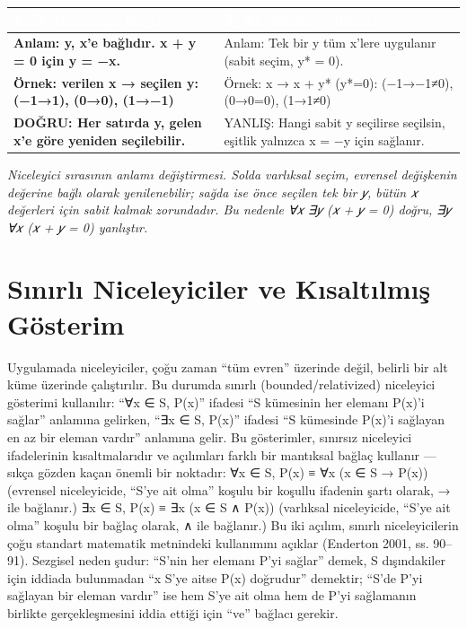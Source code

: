 \par\smallskip\begin{center}{\renewcommand{\arraystretch}{1.25}\footnotesize\begin{tabularx}{\linewidth}{|Y|Y|}\hline
{}\textcolor{white}{\bfseries ∀x ∃y  (her x için bir y)} & \textcolor{white}{\bfseries ∃y ∀x  (tek bir y, tüm x)} \\ \hline
\textbf{Anlam: y, x’e bağlıdır. x + y = 0 için y = −x.} & Anlam: Tek bir y tüm x’lere uygulanır (sabit seçim, y* = 0). \\ \hline
\textbf{Örnek: verilen x → seçilen y: (−1→1), (0→0), (1→−1)} & Örnek: x → x + y* (y*=0): (−1→−1≠0), (0→0=0), (1→1≠0) \\ \hline
\textbf{DOĞRU: Her satırda y, gelen x’e göre yeniden seçilebilir.} & YANLIŞ: Hangi sabit y seçilirse seçilsin, eşitlik yalnızca x = −y için sağlanır. \\ \hline
\end{tabularx}}\end{center}\par\smallskip

{\small\itshape\sffamily\color{gray}Niceleyici sırasının anlamı değiştirmesi. Solda varlıksal seçim, evrensel değişkenin değerine bağlı olarak yenilenebilir; sağda ise önce seçilen tek bir 𝑦, bütün 𝑥 değerleri için sabit kalmak zorundadır. Bu nedenle ∀𝑥 ∃𝑦 (𝑥 + 𝑦 = 0) doğru, ∃𝑦 ∀𝑥 (𝑥 + 𝑦 = 0) yanlıştır.}

\section{Sınırlı Niceleyiciler ve Kısaltılmış Gösterim}

Uygulamada niceleyiciler, çoğu zaman “tüm evren” üzerinde değil, belirli bir alt küme üzerinde çalıştırılır. Bu durumda sınırlı (bounded/relativized) niceleyici gösterimi kullanılır: “∀x ∈ S, P(x)” ifadesi “S kümesinin her elemanı P(x)’i sağlar” anlamına gelirken, “∃x ∈ S, P(x)” ifadesi “S kümesinde P(x)’i sağlayan en az bir eleman vardır” anlamına gelir. Bu gösterimler, sınırsız niceleyici ifadelerinin kısaltmalarıdır ve açılımları farklı bir mantıksal bağlaç kullanır — sıkça gözden kaçan önemli bir noktadır: ∀x ∈ S, P(x) ≡ ∀x (x ∈ S → P(x)) (evrensel niceleyicide, “S’ye ait olma” koşulu bir koşullu ifadenin şartı olarak, → ile bağlanır.) ∃x ∈ S, P(x) ≡ ∃x (x ∈ S ∧ P(x)) (varlıksal niceleyicide, “S’ye ait olma” koşulu bir bağlaç olarak, ∧ ile bağlanır.) Bu iki açılım, sınırlı niceleyicilerin çoğu standart matematik metnindeki kullanımını açıklar (Enderton 2001, ss. 90–91). Sezgisel neden şudur: “S’nin her elemanı P’yi sağlar” demek, S dışındakiler için iddiada bulunmadan “x S’ye aitse P(x) doğrudur” demektir; “S’de P’yi sağlayan bir eleman vardır” ise hem S’ye ait olma hem de P’yi sağlamanın birlikte gerçekleşmesini iddia ettiği için “ve” bağlacı gerekir.

